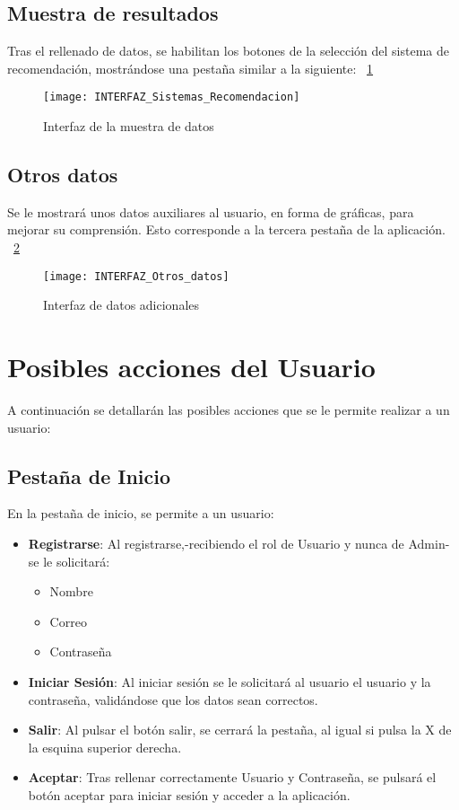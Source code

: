 \subsection{Muestra de resultados}
Tras el rellenado de datos, se habilitan los botones de la selección del sistema de recomendación, mostrándose una pestaña similar a la siguiente: ~\ref{fig:C.3.3}
\begin{figure}[h]
\centering
\texttt{[image: INTERFAZ\_Sistemas\_Recomendacion]}
\caption{Interfaz de la muestra de datos}
\label{fig:C.3.3}
\end{figure}

\subsection{Otros datos}
Se le mostrará unos datos auxiliares al usuario, en forma de gráficas, para mejorar su comprensión. Esto corresponde a la tercera pestaña de la aplicación. ~\ref{fig:C.3.4}
\begin{figure}[h]
\centering
\texttt{[image: INTERFAZ\_Otros\_datos]}
\caption{Interfaz de datos adicionales}
\label{fig:C.3.4}
\end{figure}

\section{Posibles acciones del Usuario}
A continuación se detallarán las posibles acciones que se le permite realizar a un usuario: 
\subsection{Pestaña de Inicio}
En la pestaña de inicio, se permite a un usuario: 
\begin{itemize}
\item \textbf{Registrarse}: Al registrarse,-recibiendo el rol de Usuario y nunca de Admin- se le solicitará: 
\begin{itemize}
\item Nombre
\item Correo
\item Contraseña
\end{itemize}	

\item \textbf{Iniciar Sesión}: Al iniciar sesión se le solicitará  al usuario el usuario y la contraseña, validándose que los datos sean correctos.
\item \textbf{Salir}: Al pulsar el botón salir, se cerrará la pestaña, al igual si pulsa la X de la esquina superior derecha. 
\item \textbf{Aceptar}: Tras rellenar correctamente Usuario y Contraseña, se pulsará el botón aceptar para iniciar sesión y acceder a la aplicación. 
\end{itemize}


